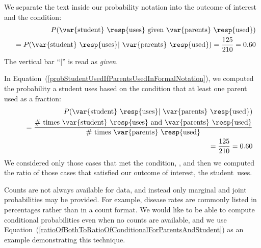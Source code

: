 We separate the text inside our probability notation into the outcome of interest and the condition:
\begin{eqnarray}
&& P(\text{\var{student} \resp{uses} given \var{parents} \resp{used}}) \notag \\
&& = P(\text{\var{student} \resp{uses}} | \text{ \var{parents} \resp{used}}) = \frac{125}{210} = 0.60
\label{probStudentUsedIfParentsUsedInFormalNotation}
\end{eqnarray}
The vertical bar ``$|$'' is read as \emph{given}.

In Equation~(\ref{probStudentUsedIfParentsUsedInFormalNotation}), we computed the probability a student uses based on the condition that at least one parent used as a fraction:
\begin{eqnarray}
&& P(\text{\var{student} \resp{uses}} | \text{ \var{parents} \resp{used}}) \notag \\
&&\quad = \frac{\text{\# times \var{student} \resp{uses} and \var{parents} \resp{used}}}{\text{\# times \var{parents} \resp{used}}} \label{ratioOfBothToRatioOfConditionalForParentsAndStudent} \\
&&\quad = \frac{125}{210} = 0.60 \notag
\end{eqnarray}
We considered only those cases that met the condition,  , and then we computed the ratio of those cases that satisfied our outcome of interest, the student~uses.

Counts are not always available for data, and instead only marginal and joint probabilities may be provided. For example, disease rates are commonly listed in percentages rather than in a count format. We would like to be able to compute conditional probabilities even when no counts are available, and we use Equation~(\ref{ratioOfBothToRatioOfConditionalForParentsAndStudent}) as an example demonstrating this technique.

